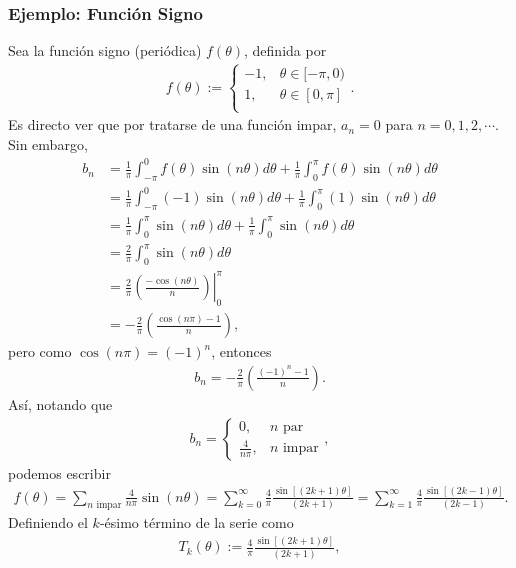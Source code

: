 \subsubsection{Ejemplo: Función Signo}
Sea la función signo (periódica) $f(\theta)$, definida por 
\begin{align}
f(\theta):=\left\{
\begin{array}{rl}
-1,& \theta \in [-\pi,0)\\
1,& \theta \in [0,\pi]\\
\end{array}\right. .
\end{align}
Es directo ver que por tratarse de una función impar, $a_{n}=0$ para $n=0,1,2,\cdots$. Sin embargo,
\begin{align}
b_{n}&=\frac{1}{\pi}\int_{-\pi}^{0}f(\theta) \sin(n\theta)d\theta+\frac{1}{\pi}\int_{0}^{\pi}f(\theta) \sin(n\theta)d\theta\\
&=\frac{1}{\pi}\int_{-\pi}^{0}(-1) \sin(n\theta)d\theta+\frac{1}{\pi}\int_{0}^{\pi} (1) \sin(n\theta)d\theta\\
&=\frac{1}{\pi}\int_{0}^{\pi} \sin(n\theta)d\theta+\frac{1}{\pi}\int_{0}^{\pi} \sin(n\theta)d\theta\\
&=\frac{2}{\pi}\int_{0}^{\pi}\sin(n\theta)d\theta\\
&=\left.\frac{2}{\pi}\left(\frac{-\cos(n\theta)}{n}\right)\right|_{0}^{\pi}\\
&=-\frac{2}{\pi}\left(\frac{\cos(n\pi)-1}{n}\right),
\end{align}
pero como $\cos(n\pi)=(-1)^{n}$, entonces
\begin{align}
b_{n}=-\frac{2}{\pi}\left(\frac{(-1)^{n}-1}{n}\right).
\end{align}
Así, notando que
\begin{align}
b_{n}=\left\{
\begin{array}{cl}
0, &n\text{ par}\\
\frac{4}{n \pi}, &n\text{ impar}
\end{array}
\right.,
\end{align}
podemos escribir
\begin{align}
f(\theta)=\sum_{n\text{ impar}}\frac{4}{n\pi}\sin(n\theta)=\sum_{k=0}^{\infty}\frac{4}{\pi}\frac{\sin[(2k+1)\theta]}{(2k+1)}=\sum_{k=1}^{\infty}\frac{4}{\pi}\frac{\sin[(2k-1)\theta]}{(2k-1)}.
\end{align}
Definiendo el $k$-ésimo término de la serie como 
\begin{align}
T_{k}(\theta):=\frac{4}{\pi}\frac{\sin[(2k+1)\theta]}{(2k+1)},
\end{align}
